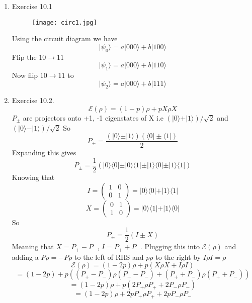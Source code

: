 \documentclass[12pt]{article}
\newcommand{\ket}[1]{\vert{#1}\rangle}
\newcommand{\bra}[1]{\langle{#1}\vert}
\begin{document}
\begin{enumerate}
    \item Exercise 10.1 
    \begin{figure}[h]
        
        \texttt{[image: circ1.jpg]}
        \centering
    \end{figure}

    Using the circuit diagram we have 
    $$ \ket{\psi_0} = a \ket{000} + b \ket{100} $$
    Flip the $10 \rightarrow 11$ 
    $$ \ket{\psi_1} = a \ket{000} + b \ket{110} $$
    Now flip $10 \rightarrow 11$ to 
    $$ \ket{\psi_2} = a \ket{000} + b \ket{111} $$

    \item Exercise 10.2. 
    $$ \mathcal{E} (\rho) = (1-p)\rho + pX \rho X $$
    $P_{\pm}$ are projectors onto +1, -1 eigenstates of X i.e $(\ket{0} + \ket{1} )/\sqrt{2}$ and $(\ket{0} - \ket{1})/\sqrt{2}$ So
    $$ P_{\pm} = \frac{(\ket{0} \pm \ket{1} ) (\bra{0} \pm \bra{1} )}{2} $$
    Expanding this gives 
    $$ P_{\pm} = \frac{1}{2} ( \ket{0} \bra{0} \pm \ket{0} \bra{1} \pm \ket{1} \bra{0} \pm \ket{1} \bra{1} ) $$
    Knowing that 
    $$ I = \begin{pmatrix}
        1&0 \\ 0&1
    \end{pmatrix} = \ket{0} \bra{0} + \ket{1} \bra{1} $$
    $$ X = \begin{pmatrix}
        0&1 \\ 1&0
    \end{pmatrix} = \ket{0} \bra{1} + \ket{1} \bra{0} $$
    So 
    $$ P_{\pm} = \frac{1}{2} (I \pm X) $$
    Meaning that $X = P_+ - P_-$, $I= P_+ + P_-$. Plugging this into $\mathcal{E} (\rho )$ and adding a $P \rho = - P \rho$ to the left of RHS and $p \rho $ to the right by $I \rho I = \rho$ 
    $$ \mathcal{E} (\rho) = (1-2p) \rho + p(X \rho X + I \rho I ) $$
    $$ = (1-2p) + p((P_+ - P_-) \rho (P_+ - P_-) + (P_+ + P_- ) \rho (P_+ + P_- )) $$
    $$ = (1-2p) \rho + p(2P_+ \rho P_+ + 2P_- \rho P_- ) $$
    $$ = (1-2p) \rho + 2p P_+ \rho P_+ + 2p P_- \rho P_- $$
    \end{enumerate}
\end{document}
